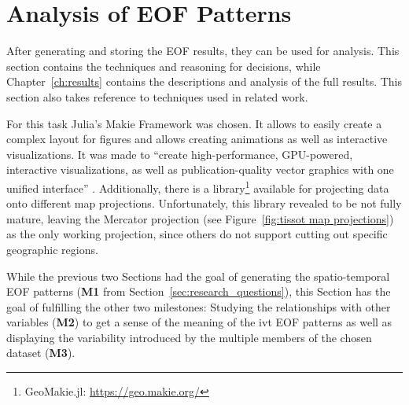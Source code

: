 \section{Analysis of EOF Patterns}
\label{sec:vis_analysis}

After generating and storing the EOF results, they can be used for analysis. 
This section contains the techniques and reasoning for decisions, while Chapter~\ref{ch:results} contains the descriptions and analysis of the full results. 
This section also takes reference to techniques used in related work. 

For this task Julia's Makie Framework \cite{danisch_makiejl_2021} was chosen. 
It allows to easily create a complex layout for figures and allows creating animations as well as interactive visualizations. 
It was made to \enquote{create high-performance, GPU-powered, interactive visualizations, as well as publication-quality vector graphics with one unified interface} \cite{danisch_makiejl_2021}. 
Additionally, there is a library\footnote{GeoMakie.jl: \url{https://geo.makie.org/}} available for projecting data onto different map projections. 
Unfortunately, this library revealed to be not fully mature, leaving the Mercator projection (see Figure~\ref{fig:tissot map projections}) as the only working projection, since others do not support cutting out specific geographic regions.  


While the previous two Sections had the goal of generating the spatio-temporal EOF patterns (\textbf{M1} from Section~\ref{sec:research_questions}), this Section has the goal of fulfilling the other two milestones:  
Studying the relationships with other variables (\textbf{M2}) to get a sense of the meaning of the \ac{ivt} EOF patterns as well as displaying the variability introduced by the multiple members of the chosen dataset (\textbf{M3}). 

